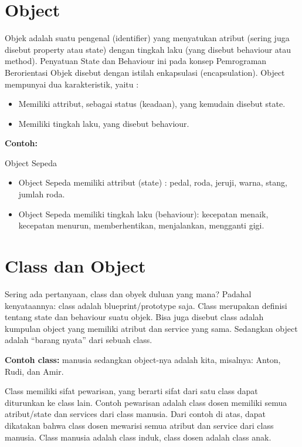 \section{Object}\label{object}

Objek adalah suatu pengenal (identifier) yang menyatukan atribut (sering
juga disebut property atau state) dengan tingkah laku (yang disebut
behaviour atau method). Penyatuan State dan Behaviour ini pada konsep
Pemrograman Berorientasi Objek disebut dengan istilah enkapsulasi
(encapsulation). Object mempunyai dua karakteristik, yaitu :

\begin{itemize}

\item
  Memiliki attribut, sebagai status (keadaan), yang kemudain disebut
  state.
\item
  Memiliki tingkah laku, yang disebut behaviour.
\end{itemize}

\textbf{Contoh:}

Object Sepeda

\begin{itemize}

\item
  Object Sepeda memiliki attribut (state) : pedal, roda, jeruji, warna,
  stang, jumlah roda.
\item
  Object Sepeda memiliki tingkah laku (behaviour): kecepatan menaik,
  kecepatan menurun, memberhentikan, menjalankan, mengganti gigi.
\end{itemize}

\section{Class dan Object}\label{class-dan-object-1}

Sering ada pertanyaan, class dan obyek duluan yang mana? Padahal
kenyataannya: class adalah blueprint/prototype saja. Class merupakan
definisi tentang state dan behaviour suatu objek. Bisa juga disebut
class adalah kumpulan object yang memiliki atribut dan service yang
sama. Sedangkan object adalah ``barang nyata'' dari sebuah class.

\textbf{Contoh class:} manusia sedangkan object-nya adalah kita, misalnya: Anton,
Rudi, dan Amir.

Class memiliki sifat pewarisan, yang berarti sifat dari satu class dapat
diturunkan ke class lain. Contoh pewarisan adalah class dosen memiliki
semua atribut/state dan services dari class manusia. Dari contoh di
atas, dapat dikatakan bahwa class dosen mewarisi semua atribut dan
service dari class manusia. Class manusia adalah class induk, class
dosen adalah class anak.

